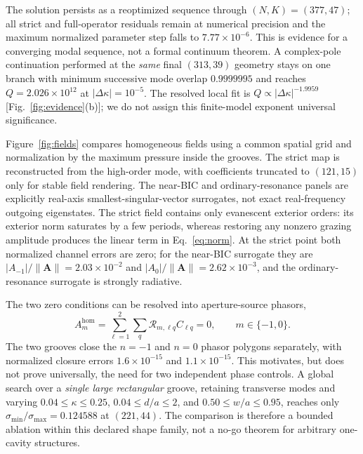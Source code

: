 \documentclass[aps,prl,reprint,superscriptaddress,nofootinbib]{revtex4-2}
\providecommand{\hom}{\mathrm{hom}}
\begin{document}
The solution persists as a reoptimized sequence through
$(N,K)=(377,47)$; all strict and full-operator residuals remain at numerical
precision and the maximum normalized parameter step falls to
$7.77\times10^{-6}$.  This is evidence for a converging modal sequence, not a
formal continuum theorem.  A complex-pole continuation performed at the
\emph{same} final $(313,39)$ geometry stays on one branch with minimum
successive mode overlap $0.9999995$ and reaches
$Q=2.026\times10^{12}$ at $|\Delta\kappa|=10^{-5}$.  The resolved local fit is
$Q\propto|\Delta\kappa|^{-1.9959}$ [Fig.~\ref{fig:evidence}(b)]; we do not
assign this finite-model exponent universal significance.

Figure~\ref{fig:fields} compares homogeneous fields using a common spatial
grid and normalization by the maximum pressure inside the grooves.  The
strict map is reconstructed from the high-order mode, with coefficients
truncated to $(121,15)$ only for stable field rendering.  The near-BIC and
ordinary-resonance panels are explicitly real-axis smallest-singular-vector
surrogates, not exact real-frequency outgoing eigenstates.  The strict field
contains only evanescent exterior orders: its exterior norm saturates by a
few periods, whereas restoring any nonzero grazing amplitude produces the
linear term in Eq.~\eqref{eq:norm}.  At the strict point both normalized
channel errors are zero; for the near-BIC surrogate they are
$|A_{-1}|/\|\bm A\|=2.03\times10^{-2}$ and
$|A_0|/\|\bm A\|=2.62\times10^{-3}$, and the ordinary-resonance surrogate is
strongly radiative.

The two zero conditions can be resolved into aperture-source phasors,
\begin{equation}
 A_m^{\hom}=\sum_{\ell=1}^{2}\sum_q
 \mathcal R_{m,\ell q}C_{\ell q}=0,
 \qquad m\in\{-1,0\}.                                                    \label{eq:phasor}
\end{equation}
The two grooves close the $n=-1$ and $n=0$ phasor polygons separately, with
normalized closure errors $1.6\times10^{-15}$ and $1.1\times10^{-15}$.
This motivates, but does not prove universally, the need for two independent
phase controls.  A global search over a \emph{single large rectangular}
groove, retaining transverse modes and varying
$0.04\leq\kappa\leq0.25$, $0.04\leq d/a\leq2$, and
$0.50\leq w/a\leq0.95$, reaches only
$\sigma_{\min}/\sigma_{\max}=0.124588$ at $(221,44)$.  The comparison is
therefore a bounded ablation within this declared shape family, not a no-go
theorem for arbitrary one-cavity structures.
\end{document}
